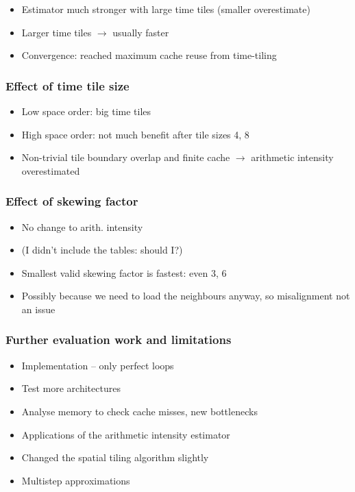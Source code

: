 \documentclass{beamer}
\begin{document}
\begin{frame}
\begin{itemize}
	\item Estimator much stronger with large time tiles (smaller overestimate)
	\item Larger time tiles \(\rightarrow\) usually faster
	\item Convergence: reached maximum cache reuse from time-tiling
\end{itemize}
\end{frame}



\begin{frame}
\frametitle{Effect of time tile size}

\begin{itemize}
	\item Low space order: big time tiles
	\item High space order: not much benefit after tile sizes 4, 8
	\item Non-trivial tile boundary overlap and finite cache \(\rightarrow\) arithmetic intensity overestimated
\end{itemize}
\end{frame}



\begin{frame}
\frametitle{Effect of skewing factor}

\begin{itemize}
	\item No change to arith. intensity
	\item (I didn't include the tables: should I?)
	\item Smallest valid skewing factor is fastest: even 3, 6
	\item Possibly because we need to load the neighbours anyway, so misalignment not an issue
\end{itemize}
\end{frame}



\begin{frame}
\frametitle{Further evaluation work and limitations}

\begin{itemize}
	\item Implementation -- only perfect loops
	\item Test more architectures
	\item Analyse memory to check cache misses, new bottlenecks
	\item Applications of the arithmetic intensity estimator
	\item Changed the spatial tiling algorithm slightly
	\item Multistep approximations
\end{itemize}
\end{frame}
\end{document}
